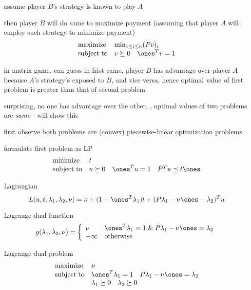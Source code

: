 \documentclass[17pt,landscape]{foils}
\begin{document}
{\vitem
	assume player $B$'s strategy is known to play $A$
	\bit
	\item
		then player $B$ will do same to maximize payment
		(assuming that player $A$ will employ such strategy to minimize payment)
		$$
			\begin{array}{ll}
				\mbox{maximize} & \min_{1\leq i\leq n} (Pv)_i
				\\
				\mbox{subject to} &
					v\succeq 0\quad \ones^Tv=1
			\end{array}
		$$
	\eit
\eit



\bit
\item
	in matrix game,
	can guess
	in frist came,
	player $B$ has advantage over player $A$ because $A$'s strategy's exposed to $B$,
	and vice versa,
	hence
	optimal value of first problem is greater than that of second problem

\vitem
	surprising,
	no one has advantage over the other,
	\ie, optimal values of two problems are \emph{same}
	-
	will show this

\vitem
	first observe both problems are (convex) piecewise-linear optimization problems

\vitem
	formulate first problem as LP
	$$
		\begin{array}{ll}
			\mbox{minimize} &
				t
			\\
			\mbox{subject to} &
				u\succeq 0 \quad \ones^T u =1 \quad P^T u \preceq t\ones
		\end{array}
	$$
	\bit
	\item
		Lagrangian
		$$
			L(u,t,\lambda_1, \lambda_2,\nu) = \nu + (1-\ones^T\lambda_1)t + (P\lambda_1 - \nu \ones - \lambda_2)^Tu
		$$
	\item
		Lagrange dual function
		$$
			g(\lambda_1, \lambda_2,\nu) = \left\{\begin{array}{ll}
				\nu & \ones^T\lambda_1 = 1 \;\&\; P\lambda_1 - \nu \ones = \lambda_2
				\\
				-\infty & \mbox{otherwise}
			\end{array}\right.
		$$
	\eit

\vitem
	Lagrange dual problem
	$$
		\begin{array}{ll}
			\mbox{maximize} &
				\nu
			\\
			\mbox{subject to} &
				\ones^T\lambda_1 = 1 \quad P\lambda_1 - \nu \ones = \lambda_2
			\\ &
				\lambda_1 \succeq 0 \quad \lambda_2 \succeq 0
		\end{array}
	$$

}
\end{document}
